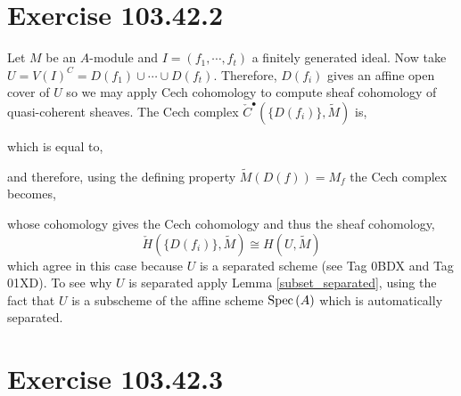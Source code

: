 \documentclass[12pt]{article}
\begin{document}

\section{Exercise 103.42.2}

Let $M$ be an $A$-module and $I = (f_1, \cdots, f_t)$ a finitely generated ideal. Now take $U = V(I)^C = D(f_1) \cup \cdots \cup D(f_t)$. Therefore, $D(f_i)$ gives an affine open cover of $U$ so we may apply Cech cohomology to compute sheaf cohomology of quasi-coherent sheaves. The Cech complex $\check{C}^\bullet(\{ D(f_i) \}, \widetilde{M})$ is,
\begin{center}
\end{center}
which is equal to,
\begin{center}
\end{center}
and therefore, using the defining property $\widetilde{M}(D(f)) = M_f$ the Cech complex becomes,
\begin{center}
\end{center}
whose cohomology gives the Cech cohomology and thus the sheaf cohomology,
\[ \check{H}(\{ D(f_i) \}, \widetilde{M}) \cong H(U, \widetilde{M}) \]
which agree in this case because $U$ is a separated scheme (see Tag 0BDX and Tag 01XD). To see why $U$ is separated apply Lemma \ref{subset_separated}, using the fact that $U$ is a subscheme of the affine scheme $\mathrm{Spec}\left( A \right)$ which is automatically separated. 

\section{Exercise 103.42.3}
\end{document}
